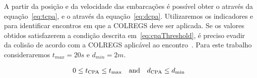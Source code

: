         A partir da posição \pos e da velocidade \vel das embarcações é possível obter o \tcpa através da equação~\eqref{eq:tcpa}, e o \dcpa através da equação~\eqref{eq:dcpa}. Utilizaremos os indicadores \tcpa e \dcpa para identificar encontros em que a COLREGS deve ser aplicada. Se os valores obtidos satisfazerem a condição descrita em~\eqref{eq:cpaThreshold}, é preciso evadir da colisão de acordo com a COLREGS aplicável ao encontro~\cite{KUWATA2014110}. Para este trabalho consideraremos $t_{max} = 20s$ e $d_{min} = 2m$.
        
        \begin{equation}\label{eq:cpaThreshold}
            0\leq t_{\rm CPA}\leq t_{\max}\quad{\hbox {and}}\quad d_{\rm CPA}\leq d_{\min}
        \end{equation}